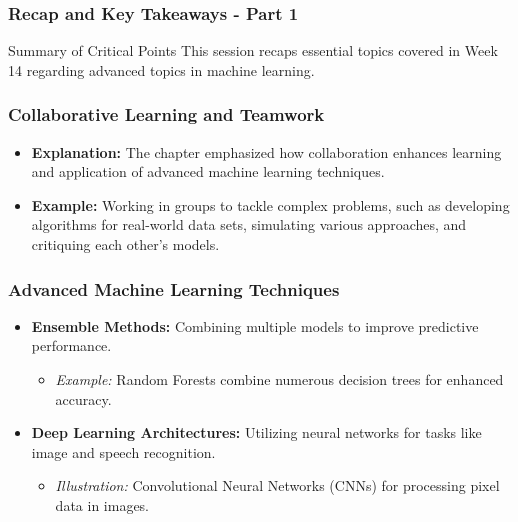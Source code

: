 \documentclass[aspectratio=169]{beamer}
\begin{document}
\begin{frame}[fragile]
    \frametitle{Recap and Key Takeaways - Part 1}
    \begin{block}{Summary of Critical Points}
        This session recaps essential topics covered in Week 14 regarding advanced topics in machine learning.
    \end{block}
\end{frame}

\begin{frame}[fragile]
    \frametitle{Collaborative Learning and Teamwork}
    \begin{itemize}
        \item \textbf{Explanation:} 
        The chapter emphasized how collaboration enhances learning and application of advanced machine learning techniques.
        \item \textbf{Example:} 
        Working in groups to tackle complex problems, such as developing algorithms for real-world data sets, simulating various approaches, and critiquing each other's models.
    \end{itemize}
\end{frame}

\begin{frame}[fragile]
    \frametitle{Advanced Machine Learning Techniques}
    \begin{itemize}
        \item \textbf{Ensemble Methods:} 
        Combining multiple models to improve predictive performance.
        \begin{itemize}
            \item \textit{Example:} Random Forests combine numerous decision trees for enhanced accuracy.
        \end{itemize}
        \item \textbf{Deep Learning Architectures:} 
        Utilizing neural networks for tasks like image and speech recognition.
        \begin{itemize}
            \item \textit{Illustration:} Convolutional Neural Networks (CNNs) for processing pixel data in images.
        \end{itemize}
    \end{itemize}
\end{frame}
\end{document}
